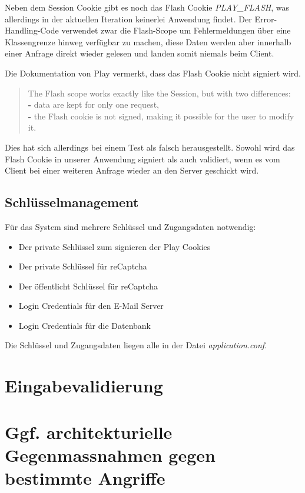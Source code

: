 \documentclass[12pt,DIV14,BCOR10mm,a4paper,parskip=half-,headsepline,headinclude,english,ngerman,bibliography=totocnumbered]{scrreprt}
\begin{document}
Neben dem Session Cookie gibt es noch das Flash Cookie \textit{PLAY\_FLASH}, was allerdings in der aktuellen Iteration keinerlei Anwendung findet. Der Error-Handling-Code verwendet zwar die Flash-Scope um Fehlermeldungen über eine Klassengrenze hinweg verfügbar zu machen, diese Daten werden aber innerhalb einer Anfrage direkt wieder gelesen und landen somit niemals beim Client.

Die Dokumentation von Play vermerkt, dass das Flash Cookie nicht signiert wird. \autocite{JavaPlayFlashDocu}
\blockquote{
The Flash scope works exactly like the Session, but with two differences: \\
\textbf{-} data are kept for only one request, \\
\textbf{-} the Flash cookie is not signed, making it possible for the user to modify it.
}
Dies hat sich allerdings bei einem Test als falsch herausgestellt. Sowohl wird das Flash Cookie in unserer Anwendung signiert als auch validiert, wenn es vom Client bei einer weiteren Anfrage wieder an den Server geschickt wird.

\subsection{Schlüsselmanagement}
Für das System sind mehrere Schlüssel und Zugangsdaten notwendig:

\begin{itemize}
	\item Der private Schlüssel zum signieren der Play Cookies
	\item Der private Schlüssel für reCaptcha
	\item Der öffentlicht Schlüssel für reCaptcha
	\item Login Credentials für den E-Mail Server
	\item Login Credentials für die Datenbank
\end{itemize}

Die Schlüssel und Zugangsdaten liegen alle in der Datei \textit{application.conf}.

\section{Eingabevalidierung}

\section{Ggf. architekturielle Gegenmassnahmen gegen bestimmte Angriffe}
\end{document}
